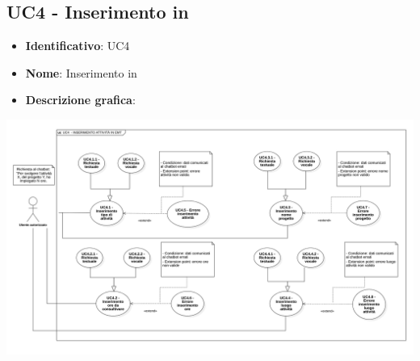 \subsection{UC4 - Inserimento  in }
\begin{itemize}
    \item \textbf{Identificativo}: UC4 
    \item \textbf{Nome}: Inserimento  in 
    \item \textbf{Descrizione grafica}:
\end{itemize}
\begin{center}
    \includegraphics[scale=0.40]{images/UC4.png} 
\end{center}
